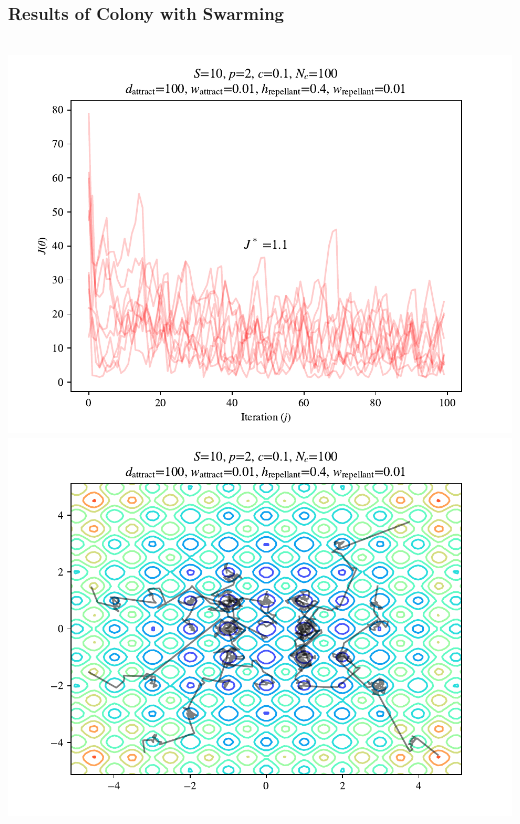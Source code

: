 \documentclass{beamer}
\begin{document}
\begin{frame}
\frametitle{Results of Colony with Swarming}
\begin{columns}[T]
    \begin{center}
      \includegraphics[scale=0.3]{assets/rastrigin_colony_tuned_J}
      \includegraphics[scale=0.3]{assets/rastrigin_colony_tuned_theta}

\end{center}
\end{columns}
\end{frame}
\end{document}
